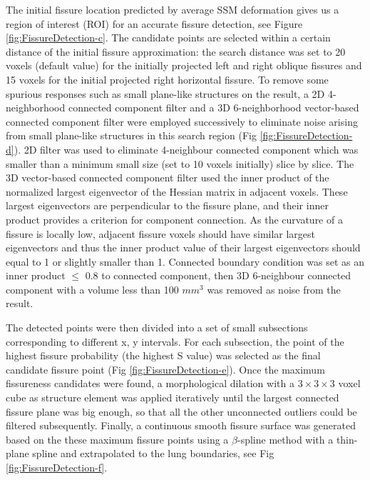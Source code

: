 {The initial fissure location predicted by average SSM deformation gives us a region of interest (ROI) for an accurate fissure detection, see Figure \ref{fig:FissureDetection-c}. The candidate points are selected within a certain distance of the initial fissure approximation: the search distance was set to 20 voxels (default value) for the initially projected left and right oblique fissures and 15 voxels for the initial projected right horizontal fissure. To remove some spurious responses such as small plane-like structures on the result, a 2D 4-neighborhood connected component filter and a 3D 6-neighborhood vector-based connected component filter were employed successively to eliminate noise arising from small plane-like structures in this search region (Fig \ref{fig:FissureDetection-d}). 2D filter was used to eliminate 4-neighbour connected component which was smaller than a minimum small size (set to 10 voxels initially) slice by slice. The 3D vector-based connected component filter used the inner product of the normalized largest eigenvector of the Hessian matrix in adjacent voxels. These largest eigenvectors are perpendicular to the fissure plane, and their inner product provides a criterion for component connection. As the curvature of a fissure is locally low, adjacent fissure voxels should have similar largest eigenvectors and thus the inner product value of their largest eigenvectors should equal to 1 or slightly smaller than 1. Connected boundary condition was set as an inner product $\leq$ 0.8 to connected component, then 3D 6-neighbour connected component with a volume less than 100 \textsl{$mm^3$} was removed as noise from the result.

The detected points were then divided into a set of small subsections corresponding to different x, y intervals. For each subsection, the point of the highest fissure probability (the highest S value) was selected as the final candidate fissure point (Fig \ref{fig:FissureDetection-e}). Once the maximum fissureness candidates were found, a morphological dilation with a $3\times3\times3$ voxel cube as structure element was applied iteratively until the largest connected fissure plane was big enough, so that all the other unconnected outliers could be filtered subsequently. Finally, a continuous smooth fissure surface was generated based on the these maximum fissure points using a $\beta$-spline method with a thin-plane spline \citep{lee1997scattered} and extrapolated to the lung boundaries, see Fig \ref{fig:FissureDetection-f}.

}
